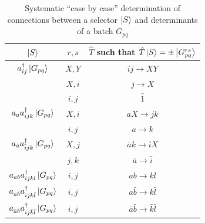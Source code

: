 \documentclass[./thesis.tex]{subfiles}
\begin{document}
\newcommand{\Gpq}{\ket {G_{pq}}}
\newcommand{\Gpbq}{\ket {G_{p \bar q}}}

\begin{table}

\caption{Systematic ``case by case'' determination of connections between a selector $\ket S$ and determinants of a batch $G_{pq}$} 
\label{tab:systematic_determination}
\begin{center}
\begin{minipage}[l]{0.6\textwidth}
        \begin{tabular}{ c|c|c }
                \hline \hline \rule{0pt}{3ex}
                $\ket S$                                                                        &$ r, s$        & $\hat T$ such that $\hat T \ket S = \pm \ket{G^{rs}_{pq}}$     \\
                \hline \hline \rule{0pt}{3ex}
                $\ac {ij} \Gpq$                                         & $X,Y$         &$ij \rightarrow XY$            \\
                                                                                        & $X,i$         &$j \rightarrow X$              \\
                                                                                        & $i,j$         &$\hat 1$                    \\
                \hline \rule{0pt}{3ex}
                $\an a \ac {ijk} \Gpq$                          &$X,i$          &$aX \rightarrow jk$            \\
                                                                                        &$i,j$          &$a \rightarrow k$              \\
                \hline \rule{0pt}{3ex}
                $\an {\bar a} \ac {\bar i jk} \Gpq$     &$X,j$          &$\bar a k \rightarrow \bar i X$                \\
                                                                                        &$j,k$          &$\bar a \rightarrow \bar i$            \\
                \hline \rule{0pt}{3ex}
                $\an {ab} \ac {ijkl} \Gpq$                      &$i,j$          &$ab \rightarrow kl$            \\
                \hline \rule{0pt}{3ex}
                $\an {a  \bar b} \ac {ijk \bar l} \Gpq$                 &$i,j$          &$a \bar b \rightarrow k \bar l$                \\
                \hline \rule{0pt}{3ex}
                $\an {\bar a \bar b} \ac {i j \bar k \bar l} \Gpq$      &$i,j$          &$\bar a \bar b \rightarrow \bar k \bar l$              \\
                

\end{tabular}
\end{minipage}
\end{center}
\end{table}
\end{document}
